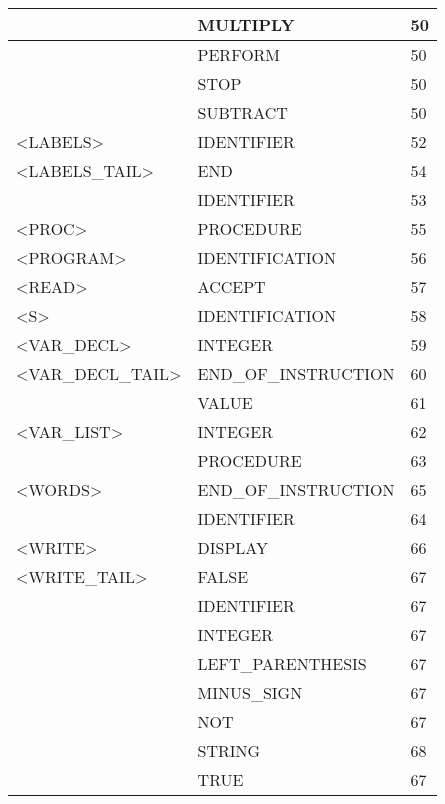 \begin{longtable}{|l|l|l|}
                     &   MULTIPLY             &   50 \\ \hline
                     &   PERFORM              &   50 \\ \hline
                     &   STOP                 &   50 \\ \hline
                     &   SUBTRACT             &   50 \\ \hline
<LABELS>             &   IDENTIFIER           &   52 \\ \hline
<LABELS\_TAIL>       &   END                  &   54 \\ \hline
                     &   IDENTIFIER           &   53 \\ \hline
<PROC>               &   PROCEDURE            &   55 \\ \hline
<PROGRAM>            &   IDENTIFICATION       &   56 \\ \hline
<READ>               &   ACCEPT               &   57 \\ \hline
<S>                  &   IDENTIFICATION       &   58 \\ \hline
<VAR\_DECL>          &   INTEGER              &   59 \\ \hline
<VAR\_DECL\_TAIL>    &   END\_OF\_INSTRUCTION   &   60 \\ \hline
                     &   VALUE                &   61 \\ \hline
<VAR\_LIST>          &   INTEGER              &   62 \\ \hline
                     &   PROCEDURE            &   63 \\ \hline
<WORDS>              &   END\_OF\_INSTRUCTION   &   65 \\ \hline
                     &   IDENTIFIER           &   64 \\ \hline
<WRITE>              &   DISPLAY              &   66 \\ \hline
<WRITE\_TAIL>        &   FALSE                &   67 \\ \hline
                     &   IDENTIFIER           &   67 \\ \hline
                     &   INTEGER              &   67 \\ \hline
                     &   LEFT\_PARENTHESIS     &   67 \\ \hline
                     &   MINUS\_SIGN           &   67 \\ \hline
                     &   NOT                  &   67 \\ \hline
                     &   STRING               &   68 \\ \hline
                     &   TRUE                 &   67 \\ \hline


\end{longtable}